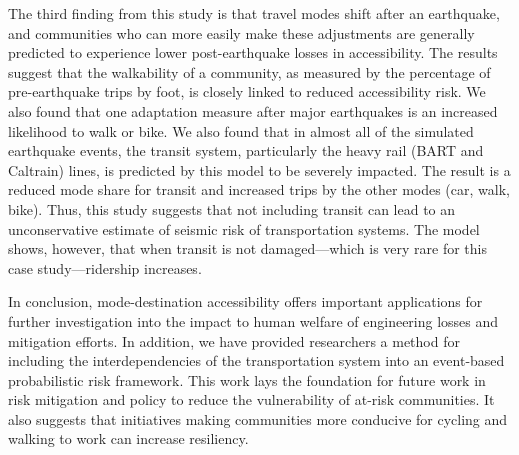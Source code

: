The third finding from this study is that travel modes shift after an earthquake, and communities who can more easily make these adjustments are generally predicted to experience lower post-earthquake losses in accessibility. The results suggest that the walkability of a community, as measured by the percentage of pre-earthquake trips by foot, is closely linked to reduced accessibility risk. We also found that one adaptation measure after major earthquakes is an increased likelihood to walk or bike. We also found that in almost all of the simulated earthquake events, the transit system, particularly the heavy rail (BART and Caltrain) lines, is predicted by this model to be severely impacted. The result is a reduced mode share for transit and increased trips by the other modes (car, walk, bike). Thus, this study suggests that not including transit can lead to an unconservative estimate of seismic risk of transportation systems. The model shows, however, that when transit is not damaged---which is very rare for this case study---ridership increases.

In conclusion,  mode-destination accessibility offers important applications for further investigation into the impact to human welfare of engineering losses and mitigation efforts. In addition, we have provided researchers a method for including the interdependencies of the transportation system into an event-based probabilistic risk framework. This work lays the foundation for future work in risk mitigation and policy to reduce the vulnerability of at-risk communities. It also suggests that initiatives making communities more conducive for cycling and walking to work can increase resiliency.

